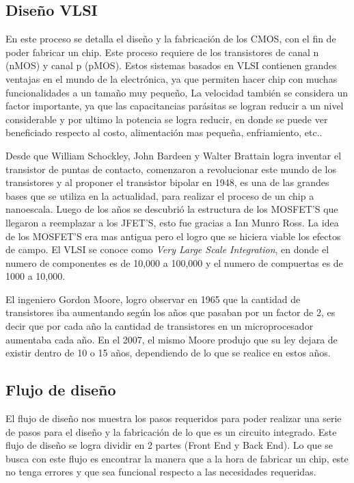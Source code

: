\subsection*{Diseño VLSI}

En este proceso se detalla el diseño y la fabricación de los CMOS, con el fin de poder fabricar un chip. Este proceso requiere de los transistores de canal n (nMOS) y canal p (pMOS).
Estos sistemas basados en VLSI contienen grandes ventajas en el mundo de la electrónica, ya que permiten hacer chip con muchas funcionalidades a un tamaño muy pequeño, La velocidad también se considera un factor importante, ya que las capacitancias parásitas se logran reducir a un nivel considerable y por ultimo la potencia se logra reducir, en donde se puede ver beneficiado respecto al costo, alimentación mas pequeña, enfriamiento, etc..

Desde que William Schockley, John Bardeen y Walter Brattain logra inventar el transistor de puntas de contacto, comenzaron a revolucionar este mundo de los transistores y al proponer el transistor bipolar en 1948, es una de las grandes bases que se utiliza en la actualidad, para realizar el proceso de un chip a nanoescala. 
Luego de los años se descubrió la estructura de los MOSFET'S que llegaron a reemplazar a los JFET'S, esto fue gracias a Ian Munro Ross. La idea  de los MOSFET'S era mas antigua pero el logro que se hiciera viable los efectos de campo.
El VLSI se conoce como \textit{Very Large Scale Integration}, en donde el numero de componentes es de 10,000 a 100,000 y el numero de compuertas es de 1000 a 10,000. 

El ingeniero Gordon Moore, logro observar en 1965 que la cantidad de transistores iba aumentando según los años que pasaban por un factor de 2, es decir que por cada año la cantidad de transistores en un microprocesador aumentaba cada año. En el 2007, el mismo Moore produjo que su ley dejara de existir dentro de 10 o 15 años, dependiendo de lo que se realice en estos años.
\cite{hoover2010bio} \cite{park2014design}


\subsection*{Flujo de diseño}

El flujo de diseño nos muestra los pasos requeridos para poder realizar una serie de pasos para el diseño y la fabricación de lo que es un circuito integrado. Este flujo de diseño se logra dividir en 2 partes (Front End y Back End). Lo que se busca con este flujo es encontrar la manera que a la hora de fabricar un chip, este no tenga errores y que sea funcional respecto a las necesidades requeridas.


